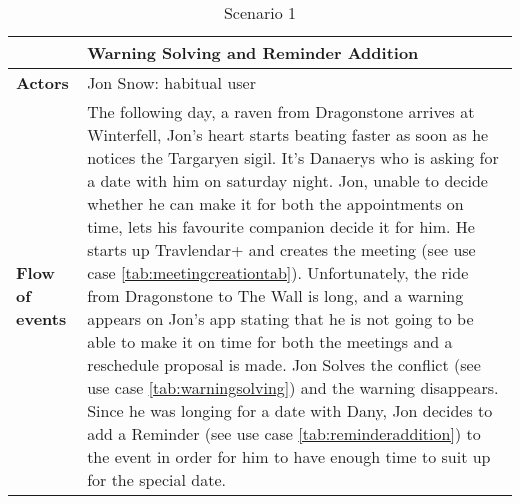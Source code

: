 \begin{table}[htp]
\begin{tabular}{lp{9cm}}
\hline
\bf\large  &\bf\large Warning Solving and Reminder Addition\\
\hline
\hline

\bf Actors&Jon Snow: habitual user\\
\hline
\bf Flow of events&
The following day, a raven from Dragonstone arrives at Winterfell, Jon's heart starts beating faster as soon as he notices the Targaryen sigil.
It's Danaerys who is asking for a date with him on saturday night.
Jon, unable to decide whether he can make it for both the appointments on time, lets his favourite companion decide it for him.
He starts up Travlendar+ and creates the meeting (see use case \autoref{tab:meetingcreationtab}).
Unfortunately, the ride from Dragonstone to The Wall is long, and a warning appears on Jon's app stating that he is not going to be able to make it on time for both the meetings and a reschedule proposal is made. 
Jon Solves the conflict (see use case \autoref{tab:warningsolving}) and the warning disappears.
Since he was longing for a date with Dany, Jon decides to add a Reminder (see use case \autoref{tab:reminderaddition}) to the event in order for him to have enough time to suit up for the special date.



\end{tabular}
\caption{Scenario 1} 
\label{tab:scenarioone}
\end{table}
